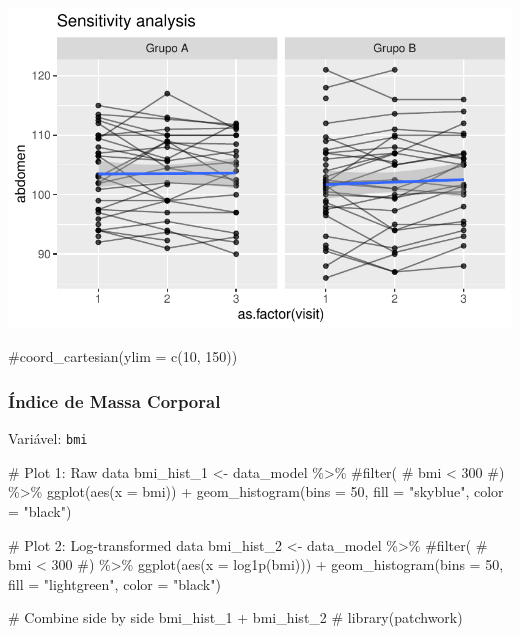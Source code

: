 \documentclass[
  letterpaper,
  DIV=11,
  numbers=noendperiod]{scrartcl}
\newenvironment{Shaded}{\begin{snugshade}}{\end{snugshade}}
\newcommand{\AttributeTok}[1]{\textcolor[rgb]{0.40,0.45,0.13}{#1}}
\newcommand{\CommentTok}[1]{\textcolor[rgb]{0.37,0.37,0.37}{#1}}
\newcommand{\DecValTok}[1]{\textcolor[rgb]{0.68,0.00,0.00}{#1}}
\newcommand{\FunctionTok}[1]{\textcolor[rgb]{0.28,0.35,0.67}{#1}}
\newcommand{\NormalTok}[1]{\textcolor[rgb]{0.00,0.23,0.31}{#1}}
\newcommand{\OtherTok}[1]{\textcolor[rgb]{0.00,0.23,0.31}{#1}}
\newcommand{\SpecialCharTok}[1]{\textcolor[rgb]{0.37,0.37,0.37}{#1}}
\newcommand{\StringTok}[1]{\textcolor[rgb]{0.13,0.47,0.30}{#1}}
\begin{document}
\includegraphics{Outcomes_V1V2V3_files/figure-pdf/abdomen_6-2.pdf}

\begin{Shaded}
\begin{Highlighting}[]
    \CommentTok{\#coord\_cartesian(ylim = c(10, 150))}
\end{Highlighting}
\end{Shaded}

\subsubsection{Índice de Massa
Corporal}\label{uxedndice-de-massa-corporal}

Variável: \texttt{bmi}

\begin{Shaded}
\begin{Highlighting}[]
\CommentTok{\# Plot 1: Raw data}
\NormalTok{bmi\_hist\_1 }\OtherTok{\textless{}{-}}\NormalTok{ data\_model }\SpecialCharTok{\%\textgreater{}\%} 
    \CommentTok{\#filter(}
    \CommentTok{\#    bmi \textless{} 300}
    \CommentTok{\#) \%\textgreater{}\% }
    \FunctionTok{ggplot}\NormalTok{(}\FunctionTok{aes}\NormalTok{(}\AttributeTok{x =}\NormalTok{ bmi)) }\SpecialCharTok{+} 
    \FunctionTok{geom\_histogram}\NormalTok{(}\AttributeTok{bins =} \DecValTok{50}\NormalTok{, }\AttributeTok{fill =} \StringTok{"skyblue"}\NormalTok{, }\AttributeTok{color =} \StringTok{"black"}\NormalTok{)}

\CommentTok{\# Plot 2: Log{-}transformed data}
\NormalTok{bmi\_hist\_2 }\OtherTok{\textless{}{-}}\NormalTok{ data\_model }\SpecialCharTok{\%\textgreater{}\%} 
    \CommentTok{\#filter(}
    \CommentTok{\#    bmi \textless{} 300}
    \CommentTok{\#) \%\textgreater{}\%}
    \FunctionTok{ggplot}\NormalTok{(}\FunctionTok{aes}\NormalTok{(}\AttributeTok{x =} \FunctionTok{log1p}\NormalTok{(bmi))) }\SpecialCharTok{+} 
    \FunctionTok{geom\_histogram}\NormalTok{(}\AttributeTok{bins =} \DecValTok{50}\NormalTok{, }\AttributeTok{fill =} \StringTok{"lightgreen"}\NormalTok{, }\AttributeTok{color =} \StringTok{"black"}\NormalTok{)}

\CommentTok{\# Combine side by side}
\NormalTok{bmi\_hist\_1 }\SpecialCharTok{+}\NormalTok{ bmi\_hist\_2 }\CommentTok{\# library(patchwork)}
\end{Highlighting}
\end{Shaded}
\end{document}
